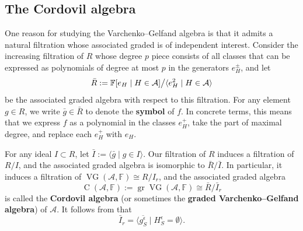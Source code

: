 \documentclass[11pt]{article}
\theoremstyle{definition}
\newcommand{\eps}{\epsilon}
\newcommand{\F}{\mathbb{F}}
\newcommand{\<}{\left<}
\renewcommand{\>}{\right>}
\newcommand{\cA}{\mathcal{A}}
\newcommand{\cS}{S}
\newcommand{\VG}{\operatorname{VG}}
\newcommand{\gr}{\operatorname{gr}}
\newcommand{\Cor}{\operatorname{C}}
\begin{document}
\subsection{The Cordovil algebra}
One reason for studying the Varchenko--Gelfand algebra is that it admits a natural filtration whose associated graded is of independent interest.
Consider the increasing filtration of $R$ whose degree $p$ piece consists of all classes that can be expressed as polynomials
of degree at most $p$ in the generators $e_H^\pm$, and let
\[
\bar R := \F[e_H\mid H\in\cA]\big{/}\langle e_H^2\mid H\in\cA\rangle
\]
be the associated graded algebra with respect to this filtration.  For any element $g\in R$, we write $\bar g\in \bar R$ to denote the {\bf symbol}
of $f$.  In concrete terms, this means that we express $f$ as a polynomial in the classes $e_H^+$, take the part of maximal degree, and replace
each $e_H^+$ with $e_H$.

For any ideal $I\subset R$, let $\bar I := \langle \bar g\mid g\in I\rangle$.
Our filtration of $R$ induces a filtration of $R/I$, and the associated graded algebra is isomorphic to $\bar R/\bar I$.
In particular, it induces a filtration of $\VG(\cA,\F) \cong R/I_r$, and the associated graded algebra 
\[
\Cor(\cA,\F) := \gr\VG(\cA,\F) \cong \bar R/\bar I_r
\]
is called the {\bf Cordovil algebra} (or sometimes the {\bf graded Varchenko--Gelfand algebra}) of $\cA$.
It follows from \cite[Theorem 7]{VarchenkoGelfand} that 
\[
\bar I_r = \big\langle \overline{g_{\cS}^\eps} \mid H_\cS^\eps = \emptyset\big\rangle.
\]
\end{document}
